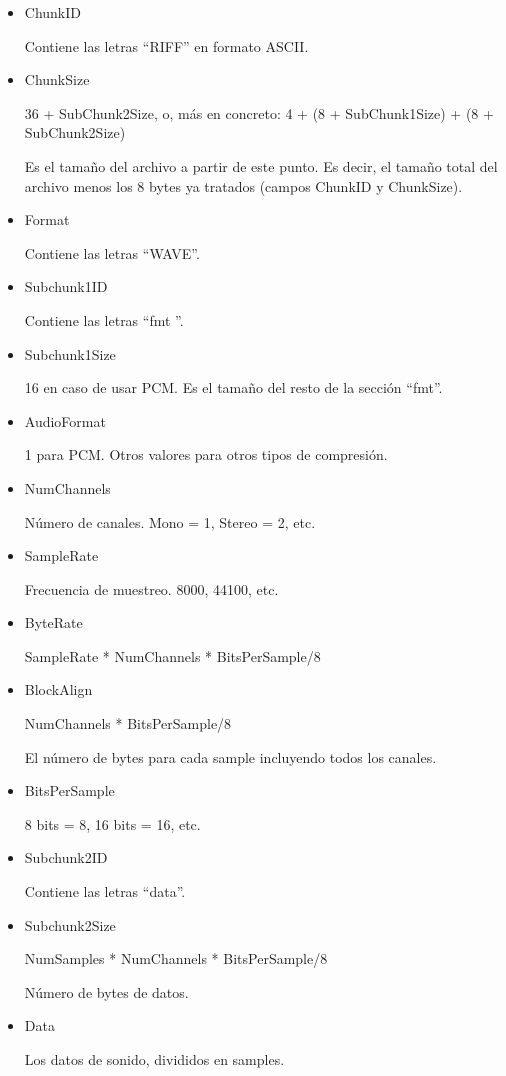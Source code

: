\documentclass[12pt]{article}
\begin{document}
\begin{itemize}

\item ChunkID          

Contiene las letras ``RIFF'' en formato ASCII.

\item ChunkSize

36 + SubChunk2Size, o, más en concreto:
4 + (8 + SubChunk1Size) + (8 + SubChunk2Size)
                               
Es el tamaño del archivo a partir de este punto. Es decir, el tamaño total del archivo menos los 8 bytes ya tratados (campos ChunkID y ChunkSize).

\item Format

Contiene las letras ``WAVE''.

\item Subchunk1ID

Contiene las letras ``fmt ''.

\item Subchunk1Size

16 en caso de usar PCM. Es el tamaño del resto de la sección ``fmt''.

\item AudioFormat

1 para PCM. Otros valores para otros tipos de compresión.

\item NumChannels

Número de canales. Mono = 1, Stereo = 2, etc.

\item SampleRate

Frecuencia de muestreo. 8000, 44100, etc.

\item ByteRate

SampleRate * NumChannels * BitsPerSample/8

\item BlockAlign

NumChannels * BitsPerSample/8
                               
El número de bytes para cada sample incluyendo todos los canales.

\item BitsPerSample

8 bits = 8, 16 bits = 16, etc.

\item Subchunk2ID

Contiene las letras ``data''.

\item Subchunk2Size

NumSamples * NumChannels * BitsPerSample/8
                               
Número de bytes de datos.

\item Data

Los datos de sonido, divididos en samples.

\end{itemize}
\end{document}
